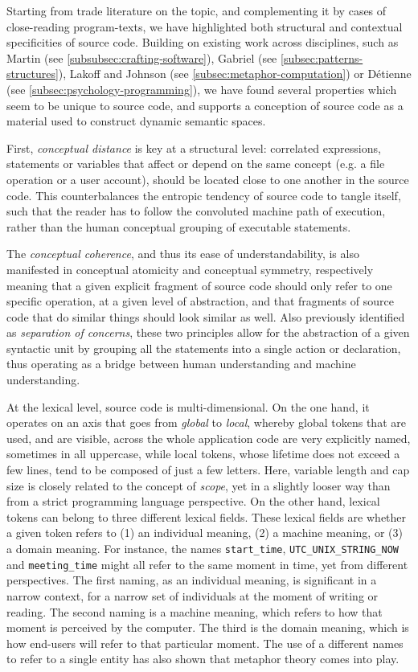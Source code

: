 Starting from trade literature on the topic, and complementing it by cases of close-reading program-texts, we have highlighted both structural and contextual specificities of source code. Building on existing work across disciplines, such as Martin (see \autoref{subsubsec:crafting-software}), Gabriel (see \autoref{subsec:patterns-structures}), Lakoff and Johnson (see \autoref{subsec:metaphor-computation}) or Détienne (see \autoref{subsec:psychology-programming}), we have found several properties which seem to be unique to source code, and supports a conception of source code as a material used to construct dynamic semantic spaces.

First, \emph{conceptual distance} is key at a structural level: correlated expressions, statements or variables that affect or depend on the same concept (e.g. a file operation or a user account), should be located close to one another in the source code. This counterbalances the entropic tendency of source code to tangle itself, such that the reader has to follow the convoluted machine path of execution, rather than the human conceptual grouping of executable statements.

The \emph{conceptual coherence}, and thus its ease of understandability, is also manifested in conceptual atomicity and conceptual symmetry, respectively meaning that a given explicit fragment of source code should only refer to one specific operation, at a given level of abstraction, and that fragments of source code that do similar things should look similar as well. Also previously identified as \emph{separation of concerns}, these two principles allow for the abstraction of a given syntactic unit by grouping all the statements into a single action or declaration, thus operating as a bridge between human understanding and machine understanding.

At the lexical level, source code is multi-dimensional. On the one hand, it operates on an axis that goes from \emph{global} to \emph{local}, whereby global tokens that are used, and are visible, across the whole application code are very explicitly named, sometimes in all uppercase, while local tokens, whose lifetime does not exceed a few lines, tend to be composed of just a few letters. Here, variable length and cap size is closely related to the concept of \emph{scope}, yet in a slightly looser way than from a strict programming language perspective. On the other hand, lexical tokens can belong to three different lexical fields. These lexical fields are whether a given token refers to (1) an individual meaning, (2) a machine meaning, or (3) a domain meaning. For instance, the names \lstinline{start_time}, \lstinline{UTC_UNIX_STRING_NOW} and \lstinline{meeting_time} might all refer to the same moment in time, yet from different perspectives. The first naming, as an individual meaning, is significant in a narrow context, for a narrow set of individuals at the moment of writing or reading. The second naming is a machine meaning, which refers to how that moment is perceived by the computer. The third is the domain meaning, which is how end-users will refer to that particular moment. The use of a different names to refer to a single entity has also shown that metaphor theory comes into play.

